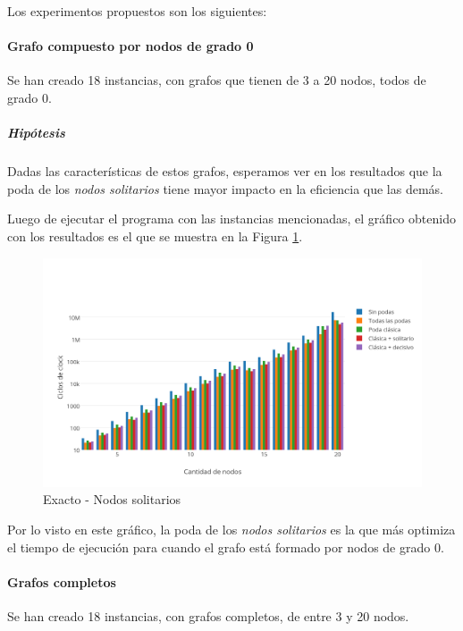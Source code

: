 Los experimentos propuestos son los siguientes:

\paragraph{Grafo compuesto por nodos de grado 0}

Se han creado 18 instancias, con grafos que tienen de 3 a 20 nodos, todos de grado 0. 

\subparagraph{Hipótesis} Dadas las características de estos grafos, esperamos ver en los resultados que la poda de los {\it nodos solitarios} tiene mayor impacto en la eficiencia que las demás.

\vspace*{0.3cm}

Luego de ejecutar el programa con las instancias mencionadas, el gráfico obtenido con los resultados es el que se muestra en la Figura \ref{fig:1C}.

\begin{figure}[htb]
	\begin{center}
    		\includegraphics[scale=0.8]{imagenes/exacto-solitarios.png}
	\end{center}
	\caption{Exacto - Nodos solitarios}\label{fig:1C}
\end{figure}

Por lo visto en este gráfico, la poda de los {\it nodos solitarios} es la que más optimiza el tiempo de ejecución para cuando el grafo está formado por nodos de grado 0.

\paragraph{Grafos completos} 

Se han creado 18 instancias, con grafos completos, de entre 3 y 20 nodos. 

